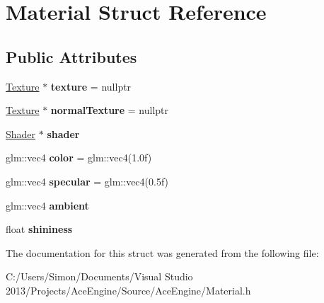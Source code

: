 \hypertarget{struct_material}{}\section{Material Struct Reference}
\label{struct_material}
\subsection*{Public Attributes}
\begin{DoxyCompactItemize}
\item 
\hypertarget{struct_material_ad151148dc3460f25435e951786171350}{}\hyperlink{struct_texture}{Texture} $\ast$ {\bfseries texture} = nullptr\label{struct_material_ad151148dc3460f25435e951786171350}

\item 
\hypertarget{struct_material_aeeb7124bd7405a68b411dbf3f2efb2db}{}\hyperlink{struct_texture}{Texture} $\ast$ {\bfseries normal\+Texture} = nullptr\label{struct_material_aeeb7124bd7405a68b411dbf3f2efb2db}

\item 
\hypertarget{struct_material_abaac6082ee6cf042b2d4da4f6e6fe403}{}\hyperlink{struct_shader}{Shader} $\ast$ {\bfseries shader}\label{struct_material_abaac6082ee6cf042b2d4da4f6e6fe403}

\item 
\hypertarget{struct_material_adbde044c90aa39f442a554a1edd3dadd}{}glm\+::vec4 {\bfseries color} = glm\+::vec4(1.\+0f)\label{struct_material_adbde044c90aa39f442a554a1edd3dadd}

\item 
\hypertarget{struct_material_ac891eeb20e11ff60f412484011d051b2}{}glm\+::vec4 {\bfseries specular} = glm\+::vec4(0.\+5f)\label{struct_material_ac891eeb20e11ff60f412484011d051b2}

\item 
\hypertarget{struct_material_a8ae15e86148278900783f3c482b26e13}{}glm\+::vec4 {\bfseries ambient}\label{struct_material_a8ae15e86148278900783f3c482b26e13}

\item 
\hypertarget{struct_material_a9dc184c883ec135ace28c1917af3fe84}{}float {\bfseries shininess}\label{struct_material_a9dc184c883ec135ace28c1917af3fe84}

\end{DoxyCompactItemize}


The documentation for this struct was generated from the following file\+:\begin{DoxyCompactItemize}
\item 
C\+:/\+Users/\+Simon/\+Documents/\+Visual Studio 2013/\+Projects/\+Ace\+Engine/\+Source/\+Ace\+Engine/Material.\+h\end{DoxyCompactItemize}
